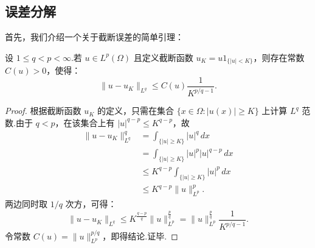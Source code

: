 \subsection{误差分解}
首先，我们介绍一个关于截断误差的简单引理：
\begin{lemma}\label{lemma:truerr}
设 $1\leq q<p<\infty$.若 $u\in L^{p}(\Omega)$ 且定义截断函数 $u_{K}=u 1_{\{|u|<K\}}$，则存在常数 $C(u)>0$，使得：
\begin{equation*}
\|u-u_{K}\|_{L^{q}} \leq C(u)\frac{1}{K^{p/q-1}}.
\end{equation*}
\end{lemma}
\begin{proof}
根据截断函数 $u_{K}$ 的定义，只需在集合 $\{x \in \Omega : |u(x)| \geq K\}$ 上计算 $L^q$ 范数.由于 $q < p$，在该集合上有 $|u|^{q-p} \leq K^{q-p}$，故
\begin{equation*}
\begin{aligned}
\|u-u_{K}\|_{L^{q}}^{q} &= \int_{\{|u| \geq K\}} |u|^{q} \, dx \\
&= \int_{\{|u| \geq K\}} |u|^{p} |u|^{q-p} \, dx \\
&\leq K^{q-p} \int_{\{|u| \geq K\}} |u|^{p} \, dx \\
&\leq K^{q-p} \|u\|_{L^{p}}^{p}.
\end{aligned}
\end{equation*}
两边同时取 $1/q$ 次方，可得：
\begin{equation*}
\|u-u_{K}\|_{L^{q}} \leq K^{\frac{q-p}{q}} \|u\|_{L^{p}}^{\frac{p}{q}} = \|u\|_{L^{p}}^{\frac{p}{q}} \frac{1}{K^{p/q-1}}.
\end{equation*}
令常数 $C(u) = \|u\|_{L^{p}}^{p/q}$，即得结论.证毕.
\end{proof}

